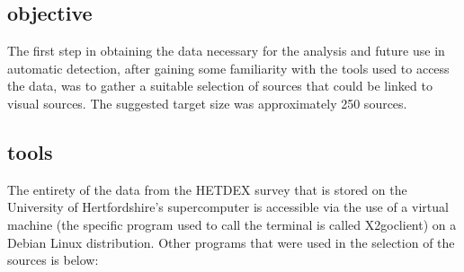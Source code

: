\documentclass{article}
\begin{document}
\subsection{objective}
The first step in obtaining the data necessary for the analysis and future use in automatic detection, after gaining some familiarity with the tools used to access the data, was to gather a suitable selection of sources that could be linked to visual sources. The suggested target size was approximately 250 sources.

\subsection{tools}
The entirety of the data from the HETDEX survey that is stored on the University of Hertfordshire's supercomputer is accessible via the use of a virtual machine (the specific program used to call the terminal is called X2goclient) on a Debian Linux distribution. Other programs that were used in the selection of the sources is below:
\end{document}
